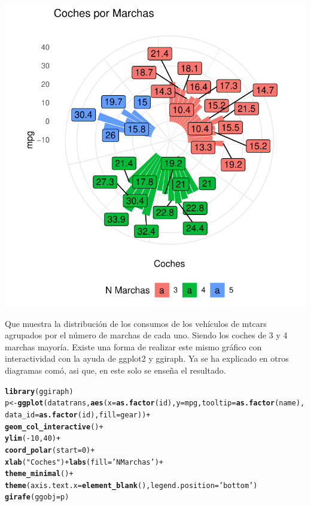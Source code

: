 \documentclass{article}\usepackage[]{graphicx}\usepackage[]{color}
\makeatletter
\def\maxwidth{ %
  \ifdim\Gin@nat@width>\linewidth
    \linewidth
  \else
    \Gin@nat@width
  \fi
}
\newcommand{\hlnum}[1]{\textcolor[rgb]{0.686,0.059,0.569}{#1}}%
\newcommand{\hlstr}[1]{\textcolor[rgb]{0.192,0.494,0.8}{#1}}%
\newcommand{\hlopt}[1]{\textcolor[rgb]{0,0,0}{#1}}%
\newcommand{\hlstd}[1]{\textcolor[rgb]{0.345,0.345,0.345}{#1}}%
\newcommand{\hlkwb}[1]{\textcolor[rgb]{0.69,0.353,0.396}{#1}}%
\newcommand{\hlkwc}[1]{\textcolor[rgb]{0.333,0.667,0.333}{#1}}%
\newcommand{\hlkwd}[1]{\textcolor[rgb]{0.737,0.353,0.396}{\textbf{#1}}}%
\newenvironment{kframe}{%
 \def\at@end@of@kframe{}%
 \ifinner\ifhmode%
  \def\at@end@of@kframe{\end{minipage}}%
  \begin{minipage}{\columnwidth}%
 \fi\fi%
 \def\FrameCommand##1{\hskip\@totalleftmargin \hskip-\fboxsep
 \colorbox{shadecolor}{##1}\hskip-\fboxsep
     \hskip-\linewidth \hskip-\@totalleftmargin \hskip\columnwidth}%
 \MakeFramed {\advance\hsize-\width
   \@totalleftmargin\z@ \linewidth\hsize
   \@setminipage}}%
 {\par\unskip\endMakeFramed%
 \at@end@of@kframe}
\newenvironment{knitrout}{}{} %
\makeatother
\begin{document}
\begin{knitrout}
\color{fgcolor}

{\centering \includegraphics[width=\maxwidth]{figure/plot_ggplot_final_cr-1} 

}



\end{knitrout}
Que muestra la distribuci\'on de los consumos de los veh\'iculos de mtcars agrupados por el n\'umero de marchas de cada uno. Siendo los coches de 3 y 4 marchas mayor\'ia.
\clearpage
Existe una forma de realizar este mismo gr\'afico con interactividad con la ayuda de ggplot2 y ggiraph. Ya se ha explicado en otros diagramas com\'o, asi que, en este solo se ense\~na el resultado.
\begin{knitrout}
\color{fgcolor}\begin{kframe}
\begin{alltt}
\hlkwd{library}\hlstd{(ggiraph)}
\hlstd{p} \hlkwb{<-} \hlkwd{ggplot}\hlstd{(datatrans,} \hlkwd{aes}\hlstd{(}\hlkwc{x}\hlstd{=}\hlkwd{as.factor}\hlstd{(id),} \hlkwc{y}\hlstd{=mpg,} \hlkwc{tooltip}\hlstd{=}\hlkwd{as.factor}\hlstd{(name),}
                      \hlkwc{data_id} \hlstd{=} \hlkwd{as.factor}\hlstd{(id),} \hlkwc{fill} \hlstd{= gear))} \hlopt{+}
  \hlkwd{geom_col_interactive}\hlstd{()} \hlopt{+}
  \hlkwd{ylim}\hlstd{(}\hlopt{-}\hlnum{10}\hlstd{,}\hlnum{40}\hlstd{)} \hlopt{+}
  \hlkwd{coord_polar}\hlstd{(}\hlkwc{start} \hlstd{=} \hlnum{0}\hlstd{)} \hlopt{+}
  \hlkwd{xlab}\hlstd{(}\hlstr{"Coches"}\hlstd{)} \hlopt{+} \hlkwd{labs}\hlstd{(}\hlkwc{fill}\hlstd{=}\hlstr{'N Marchas'}\hlstd{)} \hlopt{+}
  \hlkwd{theme_minimal}\hlstd{()} \hlopt{+}
  \hlkwd{theme}\hlstd{(}\hlkwc{axis.text.x} \hlstd{=} \hlkwd{element_blank}\hlstd{(),} \hlkwc{legend.position} \hlstd{=} \hlstr{'bottom'}\hlstd{)}
\hlkwd{girafe}\hlstd{(}\hlkwc{ggobj} \hlstd{= p)}
\end{alltt}
\end{kframe}
\end{knitrout}
\end{document}
